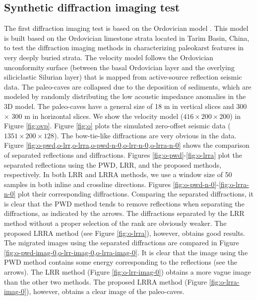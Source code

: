 \documentclass[10pt]{IEEEtran}
\begin{document}
\subsection{Synthetic diffraction imaging test}
The first diffraction imaging test is based on the Ordovician model \cite{decker2015carbonate,janson2010ultra,decker2015carbonate}. This model 
is built based on the Ordovician limestone strata located in Tarim Basin, China, to test the diffraction imaging methods in characterizing paleokarst features in very deeply buried strata. The velocity model follows the Ordovician unconformity surface (between the basal Ordovician layer and the overlying siliciclastic Silurian layer) that is mapped from active-source reflection seismic data.  The paleo-caves are collapsed due to the deposition of sediments, which are modeled by randomly distributing the low acoustic impedance anomalies in the 3D model. The paleo-caves have a general size of 18 m in vertical slices and 300 $\times$ 300 m in horizontal slices. We show the velocity model ($416\times200\times 200$) in Figure \ref{fig:ovp}. Figure \ref{fig:o} plots the simulated zero-offset seismic data ($1351\times200\times 128$). The bow-tie-like diffractions are very obvious in the data. Figure \ref{fig:o-pwd,o-lrr,o-lrra,o-pwd-n-0,o-lrr-n-0,o-lrra-n-0} shows the comparison of separated reflections and diffractions. Figures \ref{fig:o-pwd}-\ref{fig:o-lrra} plot the separated reflections using the PWD, LRR, and the proposed methods, respectively. In both LRR and LRRA methods, we use a window size of 50 samples in both inline and crossline directions. Figures \ref{fig:o-pwd-n-0}-\ref{fig:o-lrra-n-0} plot their corresponding diffractions. Comparing the separated diffractions, it is clear that the PWD method tends to remove reflections when separating the diffractions, as indicated by the arrows. The diffractions separated by the LRR method without a proper selection of the rank are obviously weaker.  The proposed LRRA method (see Figure \ref{fig:o-lrra}), however, obtains good results. The migrated images using the separated diffractions are compared in Figure \ref{fig:o-pwd-imag-0,o-lrr-imag-0,o-lrra-imag-0}. It is clear that the image using the PWD method contains some energy corresponding to the reflections (see the arrows). The LRR method (Figure \ref{fig:o-lrr-imag-0}) obtains a more vague image than the other two methods. The proposed LRRA method (Figure \ref{fig:o-lrra-imag-0}), however, obtains a clear image of the paleo-caves. 
\end{document}
